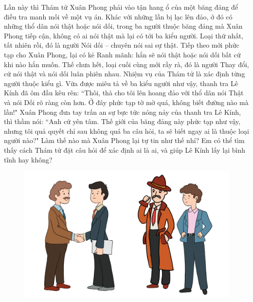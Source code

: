 \begin{multicols}{2}
	Lần này thì Thám tử Xuân Phong phải vào tận hang ổ của một băng đảng để điều tra manh mối về một vụ án. Khác với những lần bị lạc lên đảo, ở đó có những thổ dân nói thật hoặc nói dối, trong ba người thuộc  băng đảng mà Xuân Phong tiếp cận, không có ai nói thật mà lại có tới ba kiểu người. Loại thứ nhất, tất nhiên rồi, đó là người Nói dối -- chuyên nói sai sự thật. Tiếp theo mới phức tạp cho Xuân Phong, lại có kẻ Ranh mãnh: hắn sẽ nói thật hoặc nói dối bất cứ khi nào hắn muốn. Thế chưa hết, loại cuối cùng mới rầy rà, đó là người Thay đổi, cứ nói thật và nói dối luân phiên nhau. Nhiệm vụ của Thám tử là xác định  từng người thuộc kiểu gì. Vừa được miêu tả về ba kiểu người như vậy, thanh tra Lê Kính đã ôm đầu kêu rên: ``Thôi, thà cho tôi lên hoang đảo với thổ dân nói Thật và nói Dối rõ ràng còn hơn. Ở đây phức tạp tờ mờ quá, không biết đường nào mà lần!"
	\vskip 0.1cm
	Xuân Phong đưa tay trấn an sự bực tức nóng nảy của thanh tra Lê Kính, thì thầm nói: ``Anh cứ yên tâm. Thế giới của băng đảng này phức tạp như vậy, nhưng tôi quả quyết chỉ sau không quá ba câu hỏi, ta sẽ biết ngay ai là thuộc loại người nào?"
	\vskip 0.1cm
	Làm thế nào mà Xuân Phong lại tự tin như thế nhỉ? Em có thể tìm thấy cách Thám tử đặt câu hỏi để xác định ai là ai, và giúp Lê Kính lấy lại bình tĩnh hay không?
\end{multicols}
\begin{figure}[H]
	\centering
	\vspace*{-5pt}
	\captionsetup{labelformat= empty, justification=centering}
	\includegraphics[width=1\linewidth]{xuanphong}
	\vspace*{-10pt}
\end{figure}
\newpage
\begingroup
